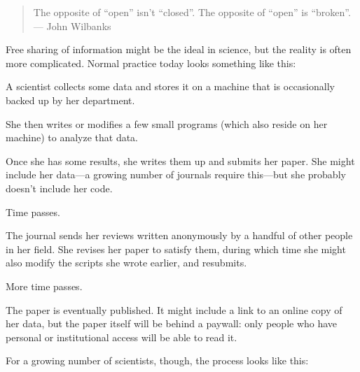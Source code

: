 \begin{quote}
The opposite of ``open'' isn't ``closed''. The opposite of ``open'' is
``broken''. \\
--- John Wilbanks
\end{quote}

Free sharing of information might be the ideal in science, but the
reality is often more complicated. Normal practice today looks something
like this:

\begin{swcitemize}
\item
  A scientist collects some data and stores it on a machine that is
  occasionally backed up by her department.
\item
  She then writes or modifies a few small programs (which also reside on
  her machine) to analyze that data.
\item
  Once she has some results, she writes them up and submits her paper.
  She might include her data---a growing number of journals require
  this---but she probably doesn't include her code.
\item
  Time passes.
\item
  The journal sends her reviews written anonymously by a handful of
  other people in her field. She revises her paper to satisfy them,
  during which time she might also modify the scripts she wrote earlier,
  and resubmits.
\item
  More time passes.
\item
  The paper is eventually published. It might include a link to an
  online copy of her data, but the paper itself will be behind a
  paywall: only people who have personal or institutional access will be
  able to read it.
\end{swcitemize}

For a growing number of scientists, though, the process looks like this:


